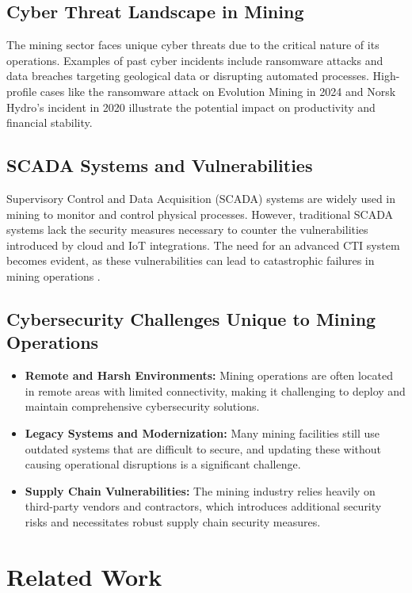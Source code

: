 \documentclass[a4paper,twoside,12pt]{report}
\begin{document}
\subsection*{Cyber Threat Landscape in Mining}
The mining sector faces unique cyber threats due to the critical nature of its operations. Examples of past cyber incidents include ransomware attacks and data breaches targeting geological data or disrupting automated processes. High-profile cases like the ransomware attack on Evolution Mining in 2024 and Norsk Hydro's incident in 2020 illustrate the potential impact on productivity and financial stability.

\subsection*{SCADA Systems and Vulnerabilities}
Supervisory Control and Data Acquisition (SCADA) systems are widely used in mining to monitor and control physical processes. However, traditional SCADA systems lack the security measures necessary to counter the vulnerabilities introduced by cloud and IoT integrations. The need for an advanced CTI system becomes evident, as these vulnerabilities can lead to catastrophic failures in mining operations \citep{wang2013cyber}.

\subsection*{Cybersecurity Challenges Unique to Mining Operations}
\begin{itemize}
    \item \textbf{Remote and Harsh Environments:} Mining operations are often located in remote areas with limited connectivity, making it challenging to deploy and maintain comprehensive cybersecurity solutions.
    \item \textbf{Legacy Systems and Modernization:} Many mining facilities still use outdated systems that are difficult to secure, and updating these without causing operational disruptions is a significant challenge.
    \item \textbf{Supply Chain Vulnerabilities:} The mining industry relies heavily on third-party vendors and contractors, which introduces additional security risks and necessitates robust supply chain security measures.
\end{itemize}

\section{Related Work}
\end{document}
